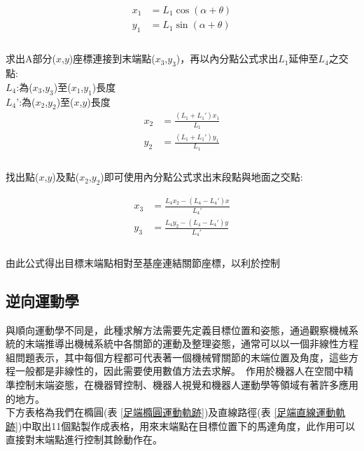 \[
\begin{aligned}
x_{1}&=L_{1}\cos \left( \alpha +\theta \right)\\
y_{1}&=L_{1}\sin \left( \alpha +\theta \right)\\
\end{aligned}
\]\\

求出A部分($x$,$y$)座標連接到末端點($x_3$,$y_3$)，再以內分點公式求出$L_1$延伸至$L_4$之交點:\\

$L_4$:為($x_3$,$y_3$)至($x_1$,$y_1$)長度\\

$L_4$':為($x_2$,$y_2$)至($x$,$y$)長度\\

\[
\begin{aligned}
x_{2}&= \frac{\left (L_{1} + L_{1}' \right) x_{1}}{L_{1}}\\
y_{2}&= \frac{\left (L_{1} + L_{1}' \right) y_{1}}{L_{1}}\\
\end{aligned}
\]\\

找出點($x$,$y$)及點($x_2$,$y_2$)即可使用內分點公式求出末段點與地面之交點:

\[
\begin{aligned}
x_{3}&= \frac{L_{4} x_{2} - \left (L_{4} - L_{4}' \right) x}{L_{4}'}\\
y_{3}&= \frac{L_{4} y_{2} - \left (L_{4} - L_{4}' \right) y}{L_{4}'}\\
\end{aligned}
\]\\

由此公式得出目標末端點相對至基座連結關節座標，以利於控制\\

\subsection{逆向運動學}
與順向運動學不同是，此種求解方法需要先定義目標位置和姿態，通過觀察機械系統的末端推導出機械系統中各關節的運動及整理姿態，通常可以以一個非線性方程組問題表示，其中每個方程都可代表著一個機械臂關節的末端位置及角度，這些方程一般都是非線性的，因此需要使用數值方法去求解。\
作用於機器人在空間中精準控制末端姿態，在機器臂控制、機器人視覺和機器人運動學等領域有著許多應用的地方。\\

下方表格為我們在橢圓(表 \ref{足端橢圓運動軌跡})及直線路徑(表 \ref{足端直線運動軌跡})中取出11個點製作成表格，用來末端點在目標位置下的馬達角度，此作用可以直接對末端點進行控制其餘動作在。

